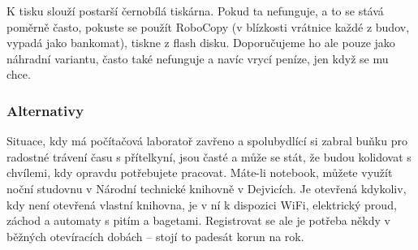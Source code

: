 K tisku slouží postarší černobílá tiskárna. Pokud ta nefunguje, a to se stává
poměrně často, pokuste se použít RoboCopy (v blízkosti vrátnice každé z budov, vypadá jako
bankomat), tiskne z flash disku. Doporučujeme ho ale pouze jako náhradní
variantu, často také nefunguje a navíc vrycí peníze, jen když se mu chce.


\subsubsection{Alternativy}
Situace, kdy má počítačová laboratoř zavřeno a spolubydlící si zabral buňku pro
radostné trávení času s přítelkyní, jsou časté a může se stát, že budou
kolidovat s chvílemi, kdy opravdu potřebujete pracovat. Máte-li notebook, můžete
využít noční studovnu v Národní technické knihovně v Dejvicích. Je otevřená
kdykoliv, kdy není otevřená vlastní knihovna, je v ní k dispozici WiFi,
elektrický proud, záchod a automaty s pitím a bagetami. Registrovat se ale je
potřeba někdy v běžných otevíracích dobách – stojí to padesát korun na rok.
